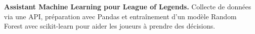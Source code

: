 
\begin{cvparagraph}
\noindent\textbf{Assistant Machine Learning pour League of Legends.} Collecte de données via une API, préparation avec Pandas et entraînement d’un modèle Random Forest avec scikit-learn pour aider les joueurs à prendre des décisions.
\end{cvparagraph}
